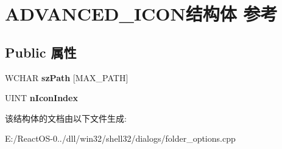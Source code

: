 \hypertarget{struct_a_d_v_a_n_c_e_d___i_c_o_n}{}\section{A\+D\+V\+A\+N\+C\+E\+D\+\_\+\+I\+C\+O\+N结构体 参考}
\label{struct_a_d_v_a_n_c_e_d___i_c_o_n}
\subsection*{Public 属性}
\begin{DoxyCompactItemize}
\item 
\mbox{\label{struct_a_d_v_a_n_c_e_d___i_c_o_n_a220d581e398b1208746bceef5df56cea}} 
W\+C\+H\+AR {\bfseries sz\+Path} \mbox{[}M\+A\+X\+\_\+\+P\+A\+TH\mbox{]}
\item 
\mbox{\label{struct_a_d_v_a_n_c_e_d___i_c_o_n_a5edd9e867cdd5f179b1908f233e43880}} 
U\+I\+NT {\bfseries n\+Icon\+Index}
\end{DoxyCompactItemize}


该结构体的文档由以下文件生成\+:\begin{DoxyCompactItemize}
\item 
E\+:/\+React\+O\+S-\/0../dll/win32/shell32/dialogs/folder\+\_\+options.\+cpp\end{DoxyCompactItemize}
